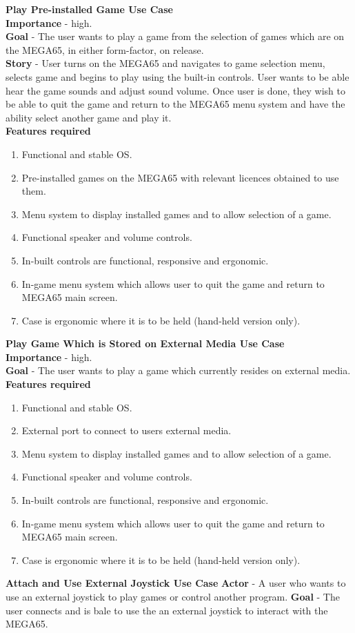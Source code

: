 \textbf{Play Pre-installed Game Use Case} \\
\textbf{Importance} - high. \\
\textbf{Goal} - The user wants to play a game from the selection of games which are on the MEGA65, in either form-factor, on release. \\
\textbf{Story} - User turns on the MEGA65 and navigates to game selection menu, selects game and begins to play using the built-in controls. User wants to be able hear the game sounds and adjust sound volume. Once user is done, they wish to be able to quit the game and return to the MEGA65 menu system and have the ability select another game and play it. \\
\textbf{Features required} \begin{enumerate}
\item Functional and stable OS.
\item Pre-installed games on the MEGA65 with relevant licences obtained to use them.
\item Menu system to display installed games and to allow selection of a game.
\item Functional speaker and volume controls.
\item In-built controls are functional, responsive and ergonomic.
\item In-game menu system which allows user to quit the game and return to MEGA65 main screen. 
\item Case is ergonomic where it is to be held (hand-held version only).\\
\end{enumerate}


\textbf{Play Game Which is Stored on External Media Use Case} \\
\textbf{Importance} - high. \\
\textbf{Goal} - The user wants to play a game which currently resides on external media. \\
\textbf{Features required} \begin{enumerate}
\item Functional and stable OS.
\item External port to connect to users external media.
\item Menu system to display installed games and to allow selection of a game.
\item Functional speaker and volume controls.
\item In-built controls are functional, responsive and ergonomic.
\item In-game menu system which allows user to quit the game and return to MEGA65 main screen. 
\item Case is ergonomic where it is to be held (hand-held version only).\\
\end{enumerate}


\textbf{Attach and Use External Joystick Use Case}
\textbf{Actor} - A user who wants to use an external joystick to play games or control another program.
\textbf{Goal} - The user connects and is bale to use the an external joystick to interact with the MEGA65.



